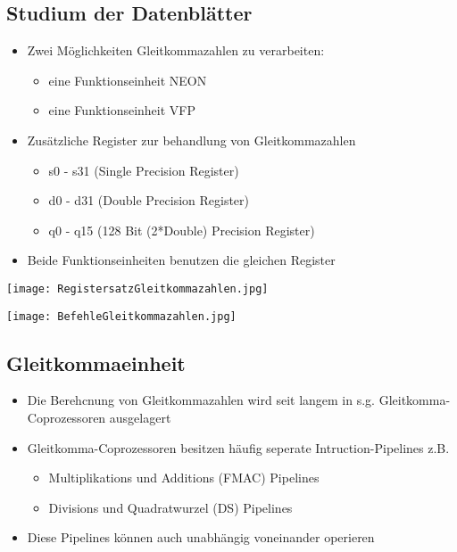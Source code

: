 	\subsection{Studium der Datenblätter}
		\begin{minipage}{0.55\textwidth}
			\begin{itemize}
				\item Zwei Möglichkeiten Gleitkommazahlen zu verarbeiten:
					\begin{itemize}
						\item eine Funktionseinheit NEON
						\item eine Funktionseinheit VFP
					\end{itemize}
				\item Zusätzliche Register zur behandlung von Gleitkommazahlen
					\begin{itemize}
						\item s0 - s31 (Single Precision Register)
						\item d0 - d31 (Double Precision Register)
						\item q0 - q15 (128 Bit (2*Double) Precision Register)
					\end{itemize}
				\item Beide Funktionseinheiten benutzen die gleichen Register
			\end{itemize}
		\end{minipage}
		\begin{minipage}{0.4\textwidth}
			\centerline{\texttt{[image: RegistersatzGleitkommazahlen.jpg]}}
		\end{minipage}

		\centerline{\texttt{[image: BefehleGleitkommazahlen.jpg]}}


	\subsection{Gleitkommaeinheit}
		\begin{itemize}
			\item Die Berehcnung von Gleitkommazahlen wird seit langem in s.g. Gleitkomma-Coprozessoren  ausgelagert
			\item Gleitkomma-Coprozessoren besitzen häufig seperate Intruction-Pipelines z.B.
				\begin{itemize}
					\item Multiplikations und Additions (FMAC) Pipelines
					\item Divisions und Quadratwurzel (DS) Pipelines
				\end{itemize}
			\item Diese Pipelines können auch unabhängig voneinander operieren
		\end{itemize}

